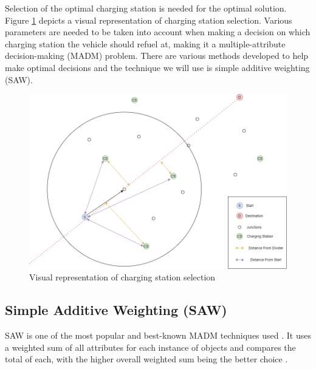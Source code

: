\documentclass[11pt]{report}
\begin{document}
Selection of the optimal charging station is needed for the optimal solution. Figure \ref{fig:5} depicts a visual representation of charging station selection. Various parameters are needed to be taken into account when making a decision on which charging station the vehicle should refuel at, making it a multiple-attribute decision-making (MADM) problem. There are various methods developed to help make optimal decisions and the technique we will use is simple additive weighting (SAW).

\begin{figure}[h!]
  \centering
  \includegraphics[width=0.85\linewidth]{CSSelection.png}
  \caption{Visual representation of charging station selection}
  \label{fig:5}
\end{figure}

\subsection{Simple Additive Weighting (SAW)}

SAW is one of the most popular and best-known MADM techniques used \autocite{chakraborty2007simulation}. It uses a weighted sum of all attributes for each instance of objects and compares the total of each, with the higher overall weighted sum being the better choice \autocite{churchman1954approximate}. 
\end{document}
